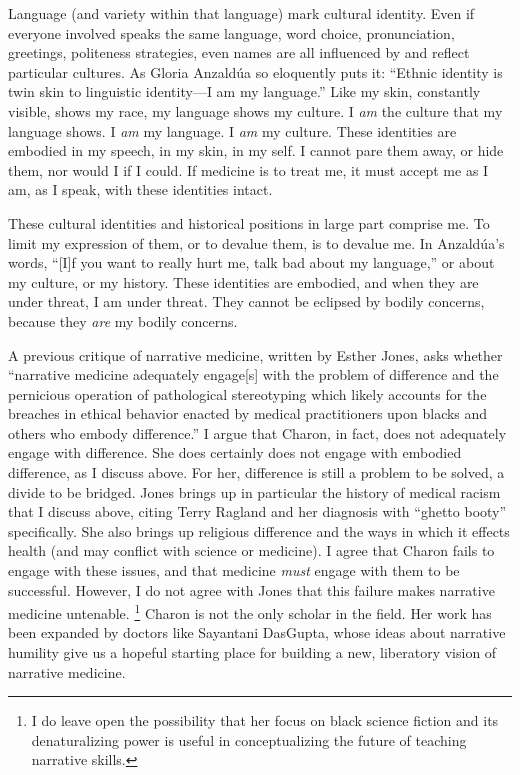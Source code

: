 \documentclass[12pt]{article}
\begin{document}
Language (and variety within that language) mark cultural identity.  Even if
everyone involved speaks the same language, word choice,\autocite{Pullum99}
pronunciation,\autocite[p.~57-58]{Thomas07,Anzaldua87} greetings, politeness
strategies,\autocite{Maha14} even names\autocite{Fryer04b} are all influenced
by and reflect particular cultures. As Gloria Anzald\'{u}a so eloquently puts
it: ``Ethnic identity is twin skin to linguistic identity---I am my
language.''\autocite[p.~59]{Anzaldua87} Like my skin, constantly visible, shows
my race, my language shows my culture. I \emph{am} the culture that my language
shows. I \emph{am} my language. I \emph{am} my culture. These identities are
embodied in my speech, in my skin, in my self. I cannot pare them away, or hide
them, nor would I if I could. If medicine is to treat me, it must accept me as
I am, as I speak, with these identities intact.

These cultural identities and historical positions in large part comprise me.
To limit my expression of them, or to devalue them, is to devalue me. In
Anzald\'{u}a's words, ``[I]f you want to really hurt me, talk bad about my
language,''\autocite[p.~59]{Anzaldua87} or about my culture, or my history.
These identities are embodied, and when they are under threat, I am under 
threat. They cannot be eclipsed by bodily concerns, because they \emph{are}
my bodily concerns.

A previous critique of narrative medicine, written by Esther Jones, asks
whether ``narrative medicine adequately engage[s] with the problem of
difference and the pernicious operation of pathological stereotyping which
likely accounts for the breaches in ethical behavior enacted by medical
practitioners upon blacks and others who embody
difference.''\autocite[p.~190]{Jones15a} I argue that Charon, in fact, does not
adequately engage with difference. She does certainly does not engage with
embodied difference, as I discuss above. For her, difference is still a problem
to be solved, a divide to be bridged. 
Jones brings up in particular the history of medical racism that I discuss
above, citing Terry Ragland and her diagnosis with ``ghetto booty''
specifically. She also brings up religious difference and the ways in which it
effects health (and may conflict with science or medicine). I agree that Charon
fails to engage with these issues, and that medicine \emph{must} engage with
them to be successful.
However, I do not agree with Jones that this failure makes narrative medicine
untenable.%
	\footnote{I do leave open the possibility that her focus on black science
	fiction and its denaturalizing power is useful in conceptualizing the
	future of teaching narrative skills.}
Charon is not the only scholar in the field. Her work has been
expanded by doctors like Sayantani DasGupta, whose ideas about narrative
humility give us a hopeful starting place for building a new, liberatory vision
of narrative medicine.
\end{document}
